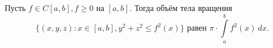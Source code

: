 
    	Пусть $f\in C[a,b], f\geq 0$ на $[a,b]$. Тогда объём тела вращения
    	$$\big\{(x,y,z)\colon x\in[a,b], y^2+z^2\leq f^2(x)\big\}\text{ равен } \pi\cdot\int\limits_a^bf^2(x)\,dx.$$
    